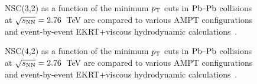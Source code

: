 \begin{figure}[p]
             \begin{center}
              \end{center}
             \caption{NSC(3,2) as a function of the minimum $p_{\rm T}$ cuts in $\textnormal{Pb--Pb}$ collisions at $\sqrt{s_{\textnormal{NN}}}=2.76$~TeV are compared to various AMPT configurations and event-by-event EKRT+viscous hydrodynamic calculations~\cite{Niemi:2015qia}.}
             \label{fig:Figure_8}
\end{figure}

\begin{figure}[p]
             \begin{center}
              \end{center}
             \caption{NSC(4,2) as a function of the minimum $p_{\rm T}$ cuts in $\textnormal{Pb--Pb}$ collisions at $\sqrt{s_{\textnormal{NN}}}=2.76$~TeV are compared to various AMPT configurations and event-by-event EKRT+viscous hydrodynamic calculations~\cite{Niemi:2015qia}.}
             \label{fig:Figure_9}
\end{figure}

